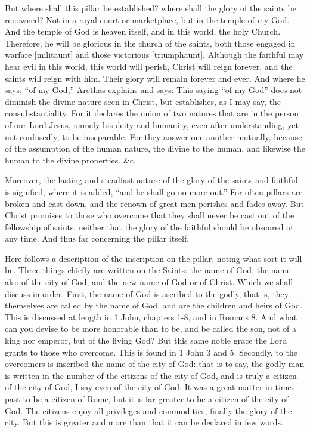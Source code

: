 But where shall this pillar be established? where shall the glory of the saints be renowned? Not in a royal court or marketplace, but in the temple of my God. And the temple of God is heaven itself, and in this world, the holy Church. Therefore, he will be glorious in the church of the saints, both those engaged in warfare [militaunt] and those victorious [triumphaunt]. Although the faithful may hear evil in this world, this world will perish, Christ will reign forever, and the saints will reign with him. Their glory will remain forever and ever. And where he says, “of my God,” Arethas explains and says: This saying “of my God” does not diminish the divine nature seen in Christ, but establishes, as I may say, the consubstantiality. For it declares the union of two natures that are in the person of our Lord Jesus, namely his deity and humanity, even after understanding, yet not confusedly, to be inseparable. For they answer one another mutually, because of the assumption of the human nature, the divine to the human, and likewise the human to the divine properties. \&c.

Moreover, the lasting and steadfast nature of the glory of the saints and faithful is signified, where it is added, “and he shall go no more out.” For often pillars are broken and cast down, and the renown of great men perishes and fades away. But Christ promises to those who overcome that they shall never be cast out of the fellowship of saints, neither that the glory of the faithful should be obscured at any time. And thus far concerning the pillar itself.

Here follows a description of the inscription on the pillar, noting what sort it will be. Three things chiefly are written on the Saints: the name of God, the name also of the city of God, and the new name of God or of Christ. Which we shall discuss in order. First, the name of God is ascribed to the godly, that is, they themselves are called by the name of God, and are the children and heirs of God. This is discussed at length in 1 John, chapters 1-8, and in Romans 8. And what can you devise to be more honorable than to be, and be called the son, not of a king nor emperor, but of the living God? But this same noble grace the Lord grants to those who overcome. This is found in 1 John 3 and 5. Secondly, to the overcomers is inscribed the name of the city of God: that is to say, the godly man is written in the number of the citizens of the city of God, and is truly a citizen of the city of God, I say even of the city of God. It was a great matter in times past to be a citizen of Rome, but it is far greater to be a citizen of the city of God. The citizens enjoy all privileges and commodities, finally the glory of the city. But this is greater and more than that it can be declared in few words.


